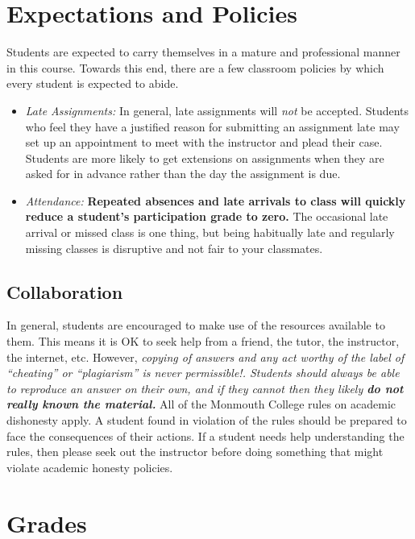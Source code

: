 \documentclass[10pt]{article}
\begin{document}
\section{Expectations and Policies}

Students are expected to carry themselves in a mature and professional manner in this course. Towards this end, there are a few classroom policies by which every student is expected to abide.
\begin{itemize}

\item \textit{Late Assignments: } In general, late assignments will \textit{not} be accepted.  Students who feel they have a justified reason for submitting an assignment late may set up an appointment to meet with the instructor and plead their case.  Students are more likely to get extensions on assignments when they are asked for in advance rather than the day the assignment is due.

\item \textit{Attendance: } \textbf{Repeated absences and late arrivals to class will quickly reduce a student's participation grade to zero.}  The occasional late arrival or missed class is one thing, but being habitually late and regularly missing classes is disruptive and not fair to your classmates.

\end{itemize}


\subsection{Collaboration}

In general, students are encouraged to make use of the resources available to them.  This means it is OK to seek help from a friend, the tutor, the instructor, the internet, etc.  However, \textit{copying of answers and any act worthy of the label of ``cheating'' or ``plagiarism'' is never permissible!. Students should always be able to reproduce an answer on their own, and if they cannot then they likely \textbf{do not really known the material.}} All of the Monmouth College rules on academic dishonesty apply.  A student found in violation of the rules should be prepared to face the consequences of their actions. If a student needs help understanding the rules, then please seek out the instructor before doing something that might violate academic honesty policies.

\section{Grades}
\end{document}
